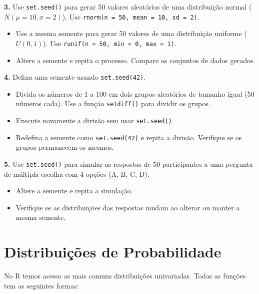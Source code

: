 \documentclass[
]{book}
\providecommand{\tightlist}{%
  \setlength{\itemsep}{0pt}\setlength{\parskip}{0pt}}
\begin{document}
\textbf{3.} Use \texttt{set.seed()} para gerar 50 valores aleatórios de uma distribuição normal (\(N(\mu=10, \sigma=2)\)). Use \texttt{rnorm(n\ =\ 50,\ mean\ =\ 10,\ sd\ =\ 2)}.

\begin{itemize}
\tightlist
\item
  Use a mesma semente para gerar 50 valores de uma distribuição uniforme (\(U(0, 1)\)). Use \texttt{runif(n\ =\ 50,\ min\ =\ 0,\ max\ =\ 1)}.
\item
  Altere a semente e repita o processo. Compare os conjuntos de dados gerados.
\end{itemize}

\textbf{4.} Defina uma semente usando \texttt{set.seed(42)}.

\begin{itemize}
\tightlist
\item
  Divida os números de 1 a 100 em dois grupos aleatórios de tamanho igual (50 números cada). Use a função \texttt{setdiff()} para dividir os grupos.
\item
  Execute novamente a divisão sem usar \texttt{set.seed()}.
\item
  Redefina a semente como \texttt{set.seed(42)} e repita a divisão. Verifique se os grupos permanecem os mesmos.
\end{itemize}

\textbf{5.} Use \texttt{set.seed()} para simular as respostas de 50 participantes a uma pergunta de múltipla escolha com 4 opções (A, B, C, D).

\begin{itemize}
\tightlist
\item
  Altere a semente e repita a simulação.
\item
  Verifique se as distribuições das respostas mudam ao alterar ou manter a mesma semente.
\end{itemize}

\chapter{Distribuições de Probabilidade}\label{distribuiuxe7uxf5es-de-probabilidade}

No R temos acesso as mais comuns distribuições univariadas. Todas as
funções tem as seguintes formas:
\end{document}
